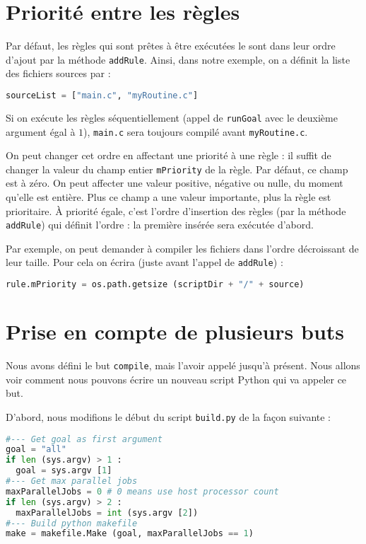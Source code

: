 \documentclass[a4paper,11pt]{extarticle}
\begin{document}
\section{Priorité entre les règles}

Par défaut, les règles qui sont prêtes à être exécutées le sont dans leur ordre d'ajout par la méthode \texttt{addRule}. Ainsi, dans notre exemple, on a définit la liste des fichiers sources par :
\begin{lstlisting}[language=py]
sourceList = ["main.c", "myRoutine.c"]
\end{lstlisting}
Si on exécute les règles séquentiellement (appel de \texttt{runGoal} avec le deuxième argument égal à $1$), \texttt{main.c} sera toujours compilé avant \texttt{myRoutine.c}.

On peut changer cet ordre en affectant une priorité à une règle : il suffit de changer la valeur du champ entier \texttt{mPriority} de la règle. Par défaut, ce champ est à zéro. On peut affecter une valeur positive, négative ou nulle, du moment qu'elle est entière. Plus ce champ a une valeur importante, plus la règle est prioritaire. À priorité égale, c'est l'ordre d'insertion des règles (par la méthode \texttt{addRule}) qui définit l'ordre : la première insérée sera exécutée d'abord.

Par exemple, on peut demander à compiler les fichiers dans l'ordre décroissant de leur taille. Pour cela on écrira (juste avant l'appel de \texttt{addRule}) :
\begin{lstlisting}[language=py]
  rule.mPriority = os.path.getsize (scriptDir + "/" + source)
\end{lstlisting}







\section{Prise en compte de plusieurs buts}

Nous avons défini le but \texttt{compile}, mais l'avoir appelé jusqu'à présent. Nous allons voir comment nous pouvons écrire un nouveau script Python qui va appeler ce but.

D'abord, nous modifions le début du script \texttt{build.py} de la façon suivante :
\begin{lstlisting}[language=py]
#--- Get goal as first argument
goal = "all"
if len (sys.argv) > 1 :
  goal = sys.argv [1]
#--- Get max parallel jobs
maxParallelJobs = 0 # 0 means use host processor count
if len (sys.argv) > 2 :
  maxParallelJobs = int (sys.argv [2])
#--- Build python makefile
make = makefile.Make (goal, maxParallelJobs == 1)
\end{lstlisting}
\end{document}
